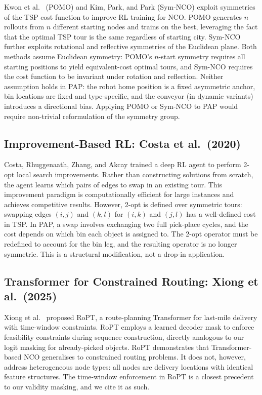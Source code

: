 \documentclass[conference]{IEEEtran}
\begin{document}
Kwon et al.\ \cite{kwon2020pomo} (POMO) and Kim, Park, and Park \cite{kim2022symnco} (Sym-NCO) exploit symmetries of the TSP cost function to improve RL training for NCO. POMO generates $n$ rollouts from $n$ different starting nodes and trains on the best, leveraging the fact that the optimal TSP tour is the same regardless of starting city. Sym-NCO further exploits rotational and reflective symmetries of the Euclidean plane. Both methods assume Euclidean symmetry: POMO's $n$-start symmetry requires all starting positions to yield equivalent-cost optimal tours, and Sym-NCO requires the cost function to be invariant under rotation and reflection. Neither assumption holds in PAP: the robot home position is a fixed asymmetric anchor, bin locations are fixed and type-specific, and the conveyor (in dynamic variants) introduces a directional bias. Applying POMO or Sym-NCO to PAP would require non-trivial reformulation of the symmetry group.

\subsection{Improvement-Based RL: Costa et al.\ (2020)}

Costa, Rhuggenaath, Zhang, and Akcay \cite{costa2020learning2opt} trained a deep RL agent to perform 2-opt local search improvements. Rather than constructing solutions from scratch, the agent learns which pairs of edges to swap in an existing tour. This improvement paradigm is computationally efficient for large instances and achieves competitive results. However, 2-opt is defined over symmetric tours: swapping edges $(i,j)$ and $(k,l)$ for $(i,k)$ and $(j,l)$ has a well-defined cost in TSP. In PAP, a swap involves exchanging two full pick-place cycles, and the cost depends on which bin each object is assigned to. The 2-opt operator must be redefined to account for the bin leg, and the resulting operator is no longer symmetric. This is a structural modification, not a drop-in application.

\subsection{Transformer for Constrained Routing: Xiong et al.\ (2025)}

Xiong et al.\ \cite{xiong2025ropt} proposed RoPT, a route-planning Transformer for last-mile delivery with time-window constraints. RoPT employs a learned decoder mask to enforce feasibility constraints during sequence construction, directly analogous to our logit masking for already-picked objects. RoPT demonstrates that Transformer-based NCO generalises to constrained routing problems. It does not, however, address heterogeneous node types: all nodes are delivery locations with identical feature structures. The time-window enforcement in RoPT is a closest precedent to our validity masking, and we cite it as such.
\end{document}
